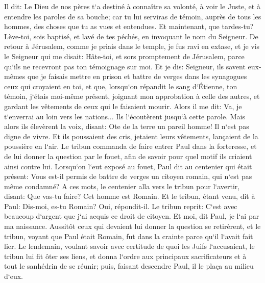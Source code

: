 \verse Il dit: Le Dieu de nos pères t`a destiné à connaître sa volonté, à voir le Juste, et à entendre les paroles de sa bouche; 
\verse car tu lui serviras de témoin, auprès de tous les hommes, des choses que tu as vues et entendues. 
\verse Et maintenant, que tardes-tu? Lève-toi, sois baptisé, et lavé de tes péchés, en invoquant le nom du Seigneur. 
\verse De retour à Jérusalem, comme je priais dans le temple, je fus ravi en extase, 
\verse et je vis le Seigneur qui me disait: Hâte-toi, et sors promptement de Jérusalem, parce qu`ils ne recevront pas ton témoignage sur moi. 
\verse Et je dis: Seigneur, ils savent eux-mêmes que je faisais mettre en prison et battre de verges dans les synagogues ceux qui croyaient en toi, et que, 
\verse lorsqu`on répandit le sang d`Étienne, ton témoin, j`étais moi-même présent, joignant mon approbation à celle des autres, et gardant les vêtements de ceux qui le faisaient mourir. 
\verse Alors il me dit: Va, je t`enverrai au loin vers les nations... 
\verse Ils l`écoutèrent jusqu`à cette parole. Mais alors ils élevèrent la voix, disant: Ote de la terre un pareil homme! Il n`est pas digne de vivre. 
\verse Et ils poussaient des cris, jetaient leurs vêtements, lançaient de la poussière en l`air. 
\verse Le tribun commanda de faire entrer Paul dans la forteresse, et de lui donner la question par le fouet, afin de savoir pour quel motif ils criaient ainsi contre lui. 
\verse Lorsqu`on l`eut exposé au fouet, Paul dit au centenier qui était présent: Vous est-il permis de battre de verges un citoyen romain, qui n`est pas même condamné? 
\verse A ces mots, le centenier alla vers le tribun pour l`avertir, disant: Que vas-tu faire? Cet homme est Romain. 
\verse Et le tribun, étant venu, dit à Paul: Dis-moi, es-tu Romain? Oui, répondit-il. 
\verse Le tribun reprit: C`est avec beaucoup d`argent que j`ai acquis ce droit de citoyen. Et moi, dit Paul, je l`ai par ma naissance. 
\verse Aussitôt ceux qui devaient lui donner la question se retirèrent, et le tribun, voyant que Paul était Romain, fut dans la crainte parce qu`il l`avait fait lier. 
\verse Le lendemain, voulant savoir avec certitude de quoi les Juifs l`accusaient, le tribun lui fit ôter ses liens, et donna l`ordre aux principaux sacrificateurs et à tout le sanhédrin de se réunir; puis, faisant descendre Paul, il le plaça au milieu d`eux. 

